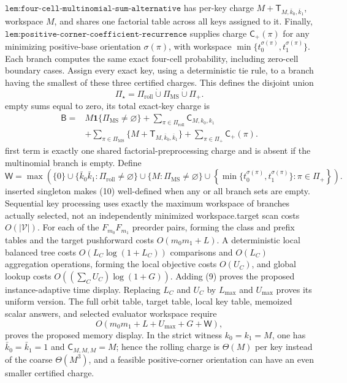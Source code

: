 \(\texttt{lem:four-cell-multinomial-sum-alternative}\) has per-key charge \(M+\mathsf T_{M,\bar k_0,\bar k_1}\), workspace \(M\), and shares one factorial table across all keys assigned to it. Finally, \(\texttt{lem:positive-corner-coefficient-recurrence}\) supplies charge \(\mathsf C_+(\pi)\) for any minimizing positive-base orientation \(\sigma(\pi)\), with workspace \(\min\{t_0^{\sigma(\pi)},t_1^{\sigma(\pi)}\}\). Each branch computes the same exact four-cell probability, including zero-cell boundary cases. Assign every exact key, using a deterministic tie rule, to a branch having the smallest of these three certified charges. This defines the disjoint union\n\[\Pi_\star=\Pi_{\mathrm{roll}}\mathbin{\dot\cup}\Pi_{\mathrm{MS}}\mathbin{\dot\cup}\Pi_+.\tag{8}\]\nWith empty sums equal to zero, its total exact-key charge is\n\[\begin{aligned}\mathsf B={}&M\mathbf 1\{\Pi_{\mathrm{MS}}\ne\varnothing\}+\sum_{\pi\in\Pi_{\mathrm{roll}}}\mathsf C_{M,k_0,k_1}\\&+\sum_{\pi\in\Pi_{\mathrm{MS}}}\{M+\mathsf T_{M,\bar k_0,\bar k_1}\}+\sum_{\pi\in\Pi_+}\mathsf C_+(\pi).\end{aligned}\tag{9}\]\nThe first term is exactly one shared factorial-preprocessing charge and is absent if the multinomial branch is empty. Define\n\[\mathsf W=\max\!\left(\{0\}\cup\{\bar k_0\bar k_1:\Pi_{\mathrm{roll}}\ne\varnothing\}\cup\{M:\Pi_{\mathrm{MS}}\ne\varnothing\}\cup\left\{\min\{t_0^{\sigma(\pi)},t_1^{\sigma(\pi)}\}:\pi\in\Pi_+\right\}\right).\tag{10}\]\nThe inserted singleton makes (10) well-defined when any or all branch sets are empty. Sequential key processing uses exactly the maximum workspace of branches actually selected, not an independently minimized workspace.\n\nThe target scan costs \(O(|\mathcal V|)\). For each of the \(F_{m_0}F_{m_1}\) preorder pairs, forming the class and prefix tables and the target pushforward costs \(O(m_0m_1+L)\). A deterministic local balanced tree costs \(O(L_C\log(1+L_C))\) comparisons and \(O(L_C)\) aggregation operations, forming the local objective costs \(O(U_C)\), and global lookup costs \(O((\sum_CU_C)\log(1+G))\). Adding (9) proves the proposed instance-adaptive time display. Replacing \(L_C\) and \(U_C\) by \(L_{\max}\) and \(U_{\max}\) proves its uniform version. The full orbit table, target table, local key table, memoized scalar answers, and selected evaluator workspace require\n\[O(m_0m_1+L+U_{\max}+G+\mathsf W),\]\nwhich proves the proposed memory display. In the strict witness \(k_0=k_1=M\), one has \(\bar k_0=\bar k_1=1\) and \(\mathsf C_{M,M,M}=M\); hence the rolling charge is \(\Theta(M)\) per key instead of the coarse \(\Theta(M^3)\), and a feasible positive-corner orientation can have an even smaller certified charge.